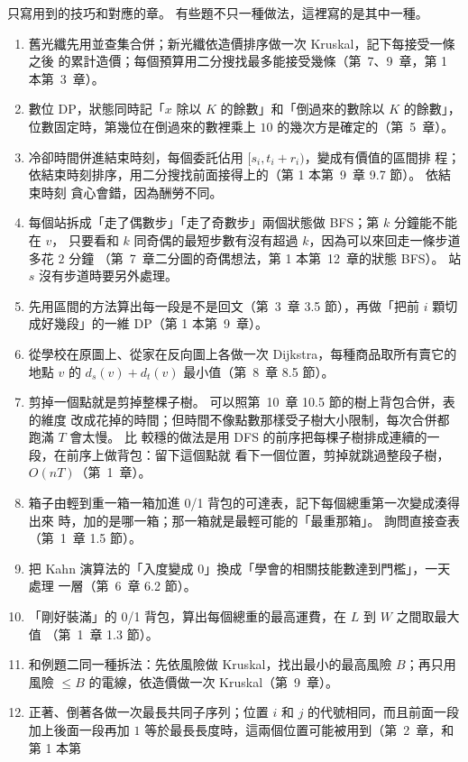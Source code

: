 只寫用到的技巧和對應的章。 有些題不只一種做法，這裡寫的是其中一種。

\begin{enumerate}
\item 舊光纖先用並查集合併；新光纖依造價排序做一次 Kruskal，記下每接受一條之後
的累計造價；每個預算用二分搜找最多能接受幾條（第~7、9~章，第 1 本第~3~章）。
\item 數位 DP，狀態同時記「$x$ 除以 $K$ 的餘數」和「倒過來的數除以 $K$ 的餘數」，
位數固定時，第幾位在倒過來的數裡乘上 $10$ 的幾次方是確定的（第~5~章）。
\item 冷卻時間併進結束時刻，每個委託佔用 $[s_i, t_i + r_i)$，變成有價值的區間排
程；依結束時刻排序，用二分搜找前面接得上的（第 1 本第~9~章 9.7 節）。 依結束時刻
貪心會錯，因為酬勞不同。
\item 每個站拆成「走了偶數步」「走了奇數步」兩個狀態做 BFS；第 $k$ 分鐘能不能在 $v$，
只要看和 $k$ 同奇偶的最短步數有沒有超過 $k$，因為可以來回走一條步道多花 $2$ 分鐘
（第~7~章二分圖的奇偶想法，第 1 本第~12~章的狀態 BFS）。 站 $s$ 沒有步道時要另外處理。
\item 先用區間的方法算出每一段是不是回文（第~3~章 3.5 節），再做「把前 $i$ 顆切
成好幾段」的一維 DP（第 1 本第~9~章）。
\item 從學校在原圖上、從家在反向圖上各做一次 Dijkstra，每種商品取所有賣它的地點
$v$ 的 $d_s(v) + d_t(v)$ 最小值（第~8~章 8.5 節）。
\item 剪掉一個點就是剪掉整棵子樹。 可以照第~10~章 10.5 節的樹上背包合併，表的維度
改成花掉的時間；但時間不像點數那樣受子樹大小限制，每次合併都跑滿 $T$ 會太慢。 比
較穩的做法是用 DFS 的前序把每棵子樹排成連續的一段，在前序上做背包：留下這個點就
看下一個位置，剪掉就跳過整段子樹，$O(nT)$（第~1~章）。
\item 箱子由輕到重一箱一箱加進 0/1 背包的可達表，記下每個總重第一次變成湊得出來
時，加的是哪一箱；那一箱就是最輕可能的「最重那箱」。 詢問直接查表（第~1~章 1.5
節）。
\item 把 Kahn 演算法的「入度變成 $0$」換成「學會的相關技能數達到門檻」，一天處理
一層（第~6~章 6.2 節）。
\item 「剛好裝滿」的 0/1 背包，算出每個總重的最高運費，在 $L$ 到 $W$ 之間取最大值
（第~1~章 1.3 節）。
\item 和例題二同一種拆法：先依風險做 Kruskal，找出最小的最高風險 $B$；再只用風險
$\le B$ 的電線，依造價做一次 Kruskal（第~9~章）。
\item 正著、倒著各做一次最長共同子序列；位置 $i$ 和 $j$ 的代號相同，而且前面一段
加上後面一段再加 $1$ 等於最長長度時，這兩個位置可能被用到（第~2~章，和第 1 本第

\end{enumerate}

